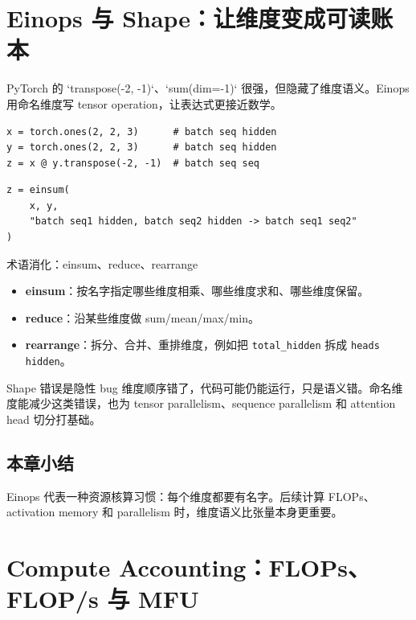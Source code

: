 \documentclass[a4paper]{article}
\begin{document}
\section{Einops 与 Shape：让维度变成可读账本}

PyTorch 的 `transpose(-2, -1)`、`sum(dim=-1)` 很强，但隐藏了维度语义。Einops 用命名维度写 tensor operation，让表达式更接近数学。

\begin{lstlisting}[caption={传统 PyTorch 写法容易隐藏维度含义}]
x = torch.ones(2, 2, 3)      # batch seq hidden
y = torch.ones(2, 2, 3)      # batch seq hidden
z = x @ y.transpose(-2, -1)  # batch seq seq
\end{lstlisting}

\begin{lstlisting}[caption={Einops/einsum 用名字表达维度收缩}]
z = einsum(
    x, y,
    "batch seq1 hidden, batch seq2 hidden -> batch seq1 seq2"
)
\end{lstlisting}

\begin{knowledgebox}{术语消化：einsum、reduce、rearrange}
\begin{itemize}
    \item \textbf{einsum}：按名字指定哪些维度相乘、哪些维度求和、哪些维度保留。
    \item \textbf{reduce}：沿某些维度做 sum/mean/max/min。
    \item \textbf{rearrange}：拆分、合并、重排维度，例如把 \texttt{total\_hidden} 拆成 \texttt{heads hidden}。
\end{itemize}
\end{knowledgebox}

\begin{warningbox}{Shape 错误是隐性 bug}
维度顺序错了，代码可能仍能运行，只是语义错。命名维度能减少这类错误，也为 tensor parallelism、sequence parallelism 和 attention head 切分打基础。
\end{warningbox}

\subsection{本章小结}

Einops 代表一种资源核算习惯：每个维度都要有名字。后续计算 FLOPs、activation memory 和 parallelism 时，维度语义比张量本身更重要。

\section{Compute Accounting：FLOPs、FLOP/s 与 MFU}
\end{document}
